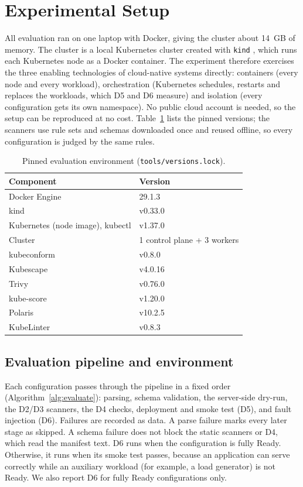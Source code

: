 \section{Experimental Setup}\label{sec:setup}

All evaluation ran on one laptop with Docker, giving the cluster about 14~GB of memory. The cluster is a local Kubernetes cluster created with \texttt{kind} \citep{tool_kind}, which runs each Kubernetes node as a Docker container. The experiment therefore exercises the three enabling technologies of cloud-native systems directly: containers (every node and every workload), orchestration (Kubernetes schedules, restarts and replaces the workloads, which D5 and D6 measure) and isolation (every configuration gets its own namespace). No public cloud account is needed, so the setup can be reproduced at no cost. Table~\ref{tab:env} lists the pinned versions; the scanners use rule sets and schemas downloaded once and reused offline, so every configuration is judged by the same rules.

\begin{table}[t]
\centering\small
\caption{Pinned evaluation environment (\texttt{tools/versions.lock}).}\label{tab:env}
\begin{tabular}{ll}
\toprule
Component & Version \\ \midrule
Docker Engine & 29.1.3 \\
kind & v0.33.0 \\
Kubernetes (node image), kubectl & v1.37.0 \\
Cluster & 1 control plane + 3 workers \\
kubeconform & v0.8.0 \\
Kubescape & v4.0.16 \\
Trivy & v0.76.0 \\
kube-score & v1.20.0 \\
Polaris & v10.2.5 \\
KubeLinter & v0.8.3 \\
\bottomrule
\end{tabular}
\end{table}

\subsection{Evaluation pipeline and environment}\label{sec:method-pipeline}

Each configuration passes through the pipeline in a fixed order (Algorithm~\ref{alg:evaluate}): parsing, schema validation, the server-side dry-run, the D2/D3 scanners, the D4 checks, deployment and smoke test (D5), and fault injection (D6). Failures are recorded as data. A parse failure marks every later stage as skipped. A schema failure does not block the static scanners or D4, which read the manifest text. D6 runs when the configuration is fully Ready. Otherwise, it runs when its smoke test passes, because an application can serve correctly while an auxiliary workload (for example, a load generator) is not Ready. We also report D6 for fully Ready configurations only.

